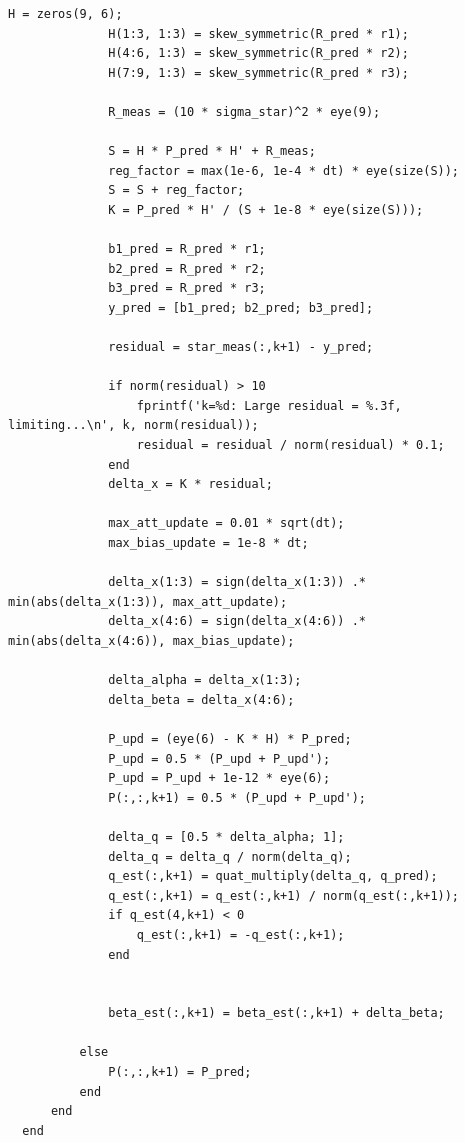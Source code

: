 \documentclass[12pt,A4, onecolumn]{exam}
\begin{document}
\begin{questions}
\begin{lstlisting}[style=matlabstyle]
              H = zeros(9, 6);
              H(1:3, 1:3) = skew_symmetric(R_pred * r1);
              H(4:6, 1:3) = skew_symmetric(R_pred * r2);
              H(7:9, 1:3) = skew_symmetric(R_pred * r3);
              
              R_meas = (10 * sigma_star)^2 * eye(9);

              S = H * P_pred * H' + R_meas;
              reg_factor = max(1e-6, 1e-4 * dt) * eye(size(S));
              S = S + reg_factor;
              K = P_pred * H' / (S + 1e-8 * eye(size(S))); 
              
              b1_pred = R_pred * r1;
              b2_pred = R_pred * r2; 
              b3_pred = R_pred * r3;
              y_pred = [b1_pred; b2_pred; b3_pred];
              
              residual = star_meas(:,k+1) - y_pred;
              
              if norm(residual) > 10
                  fprintf('k=%d: Large residual = %.3f, limiting...\n', k, norm(residual));
                  residual = residual / norm(residual) * 0.1; 
              end
              delta_x = K * residual;
              
              max_att_update = 0.01 * sqrt(dt); 
              max_bias_update = 1e-8 * dt; 
              
              delta_x(1:3) = sign(delta_x(1:3)) .* min(abs(delta_x(1:3)), max_att_update);
              delta_x(4:6) = sign(delta_x(4:6)) .* min(abs(delta_x(4:6)), max_bias_update);
              
              delta_alpha = delta_x(1:3);
              delta_beta = delta_x(4:6);
              
              P_upd = (eye(6) - K * H) * P_pred;
              P_upd = 0.5 * (P_upd + P_upd');
              P_upd = P_upd + 1e-12 * eye(6);
              P(:,:,k+1) = 0.5 * (P_upd + P_upd');
              
              delta_q = [0.5 * delta_alpha; 1];
              delta_q = delta_q / norm(delta_q);
              q_est(:,k+1) = quat_multiply(delta_q, q_pred);
              q_est(:,k+1) = q_est(:,k+1) / norm(q_est(:,k+1));
              if q_est(4,k+1) < 0
                  q_est(:,k+1) = -q_est(:,k+1);
              end

              
              beta_est(:,k+1) = beta_est(:,k+1) + delta_beta;
              
          else
              P(:,:,k+1) = P_pred;
          end
      end
  end


\end{lstlisting}
\end{questions}
\end{document}
